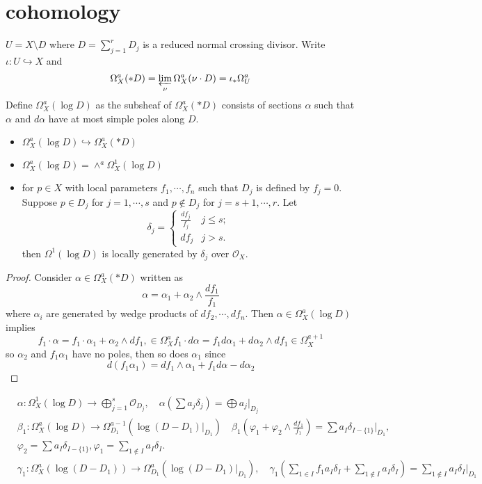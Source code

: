 \documentclass[leqno]{amsart}
\newcommand{\1}{\mathbf{1}}
\theoremstyle{definition}
\theoremstyle{remark}
\begin{document}
\section{cohomology}

$U=X\setminus D$ where
$D=\sum_{j=1}^rD_j$ is a reduced normal crossing divisor.
Write $\iota\colon U\hookrightarrow X$ and
\[
	 \Omega_X^a(*D)=\varprojlim_\nu \Omega_X^a(\nu\cdot D)
	 =\iota_*\Omega_U^a
\]
Define $\Omega_X^a(\log D)$ as the subsheaf of $\Omega_X^a(*D)$
consists of sections  $\alpha$ such that 
$\alpha$ and  $d\alpha$ have at most simple poles along  $D$.
\begin{itemize}
	\item $\Omega_X^a(\log D)\hookrightarrow \Omega_X^a(*D)$
	\item  $\Omega_X^a(\log D)=\wedge^a \Omega_X^1(\log D)$
	\item for  $p\in X$ with local parameters
		 $f_1,\cdots,f_n$ such that 
		 $D_j$ is defined by  $f_j=0$.
		 Suppose  $p\in D_j$ for  $j=1,\cdots,s$ and 
		 $p\notin D_j$ for  $j=s+1,\cdots,r$.
		 Let
		 \[
		 	\delta_j=
			\begin{cases}
				\frac{df_j}{f_j} & j\leq s;\\
				df_j & j>s.
			\end{cases}
		 \]
		 then $\Omega^1(\log D)$
		 is locally generated by $\delta_j$
		 over  $\mathcal{O}_X$.
\end{itemize}
\begin{proof}
	Consider $\alpha\in \Omega_X^a(*D)$ written as
	 \[
		\alpha=\alpha_1+\alpha_2\wedge\frac{df_1}{f_1}
	\]
	where $\alpha_i$ are generated by wedge products
	of  $df_2,\cdots,df_n$. 
	Then $\alpha\in \Omega_X^a(\log D)$ implies
	 \[
	f_1\cdot \alpha=f_1\cdot\alpha_1+\alpha_2\wedge df_1,
	\in \Omega_X^a
	f_1\cdot d\alpha=f_1d\alpha_1+d\alpha_2\wedge df_1
	\in \Omega_X^{a+1}
	\]
	so $\alpha_2$ and  $f_1\alpha_1$ have no poles,
	then so does $\alpha_1$ since
	 \[
		 d(f_1\alpha_1)=
		 df_1\wedge\alpha_1+f_1d\alpha-d\alpha_2
	\]
\end{proof}

\begin{align}
	&\alpha\colon \Omega_X^1(\log D)\to
	\bigoplus_{j=1}^s\mathcal{O}_{D_j},\quad
	\alpha(\sum a_j\delta_j)=\bigoplus a_j\vert_{D_j}\\
	&\beta_1\colon \Omega_X^a(\log D)\to 
	\Omega_{D_1}^{a-1}(\log(D-D_1)\vert_{D_1})\quad
	\beta_1(\varphi_1+\varphi_2\wedge\frac{df_1}{f_1})
	=\sum a_I\delta_{I-\{1\}}\vert_{D_1},\\
	&\varphi_2=\sum a_I\delta_{I-\{1\}},
	\varphi_1=\sum_{1\notin I} a_I\delta_I.\\
	&\gamma_1\colon 
	\Omega_X^a(\log(D-D_1))\to 
	\Omega_{D_1}^a(\log(D-D_1)\vert_{D_1}),\quad
	\gamma_1(\sum_{1\in I}f_1a_I\delta_I+
	\sum_{1\notin I}a_I\delta_I)=
	\sum_{1\notin I}a_I\delta_I\vert_{D_1}
\end{align}
\end{document}
